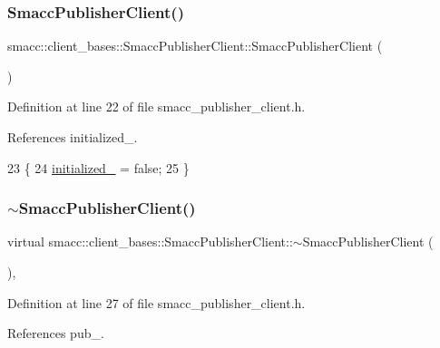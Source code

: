 \subsubsection{\texorpdfstring{Smacc\+Publisher\+Client()}{SmaccPublisherClient()}}
{\footnotesize\ttfamily smacc\+::client\+\_\+bases\+::\+Smacc\+Publisher\+Client\+::\+Smacc\+Publisher\+Client (\begin{DoxyParamCaption}{ }\end{DoxyParamCaption})\hspace{0.3cm}{\ttfamily [inline]}}



Definition at line 22 of file smacc\+\_\+publisher\+\_\+client.\+h.



References initialized\+\_\+.


\begin{DoxyCode}
23   \{
24     \hyperlink{classsmacc_1_1client__bases_1_1SmaccPublisherClient_acb2fbd8b9797ce286d9ecc0419e2cc55}{initialized\_} = \textcolor{keyword}{false};
25   \}
\end{DoxyCode}
\mbox{\label{classsmacc_1_1client__bases_1_1SmaccPublisherClient_ad528f768a7b99560db514924f9cb789f}} 
\subsubsection{\texorpdfstring{$\sim$\+Smacc\+Publisher\+Client()}{~SmaccPublisherClient()}}
{\footnotesize\ttfamily virtual smacc\+::client\+\_\+bases\+::\+Smacc\+Publisher\+Client\+::$\sim$\+Smacc\+Publisher\+Client (\begin{DoxyParamCaption}{ }\end{DoxyParamCaption})\hspace{0.3cm}{\ttfamily [inline]}, {\ttfamily [virtual]}}



Definition at line 27 of file smacc\+\_\+publisher\+\_\+client.\+h.



References pub\+\_\+.


